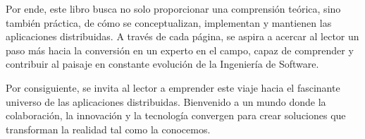Por ende, este libro busca no solo proporcionar una comprensión teórica, sino también práctica, de cómo se conceptualizan, implementan y mantienen las aplicaciones distribuidas. A través de cada página, se aspira a acercar al lector un paso más hacia la conversión en un experto en el campo, capaz de comprender y contribuir al paisaje en constante evolución de la Ingeniería de Software.

Por consiguiente, se invita al lector a emprender este viaje hacia el fascinante universo de las aplicaciones distribuidas. Bienvenido a un mundo donde la colaboración, la innovación y la tecnología convergen para crear soluciones que transforman la realidad tal como la conocemos.